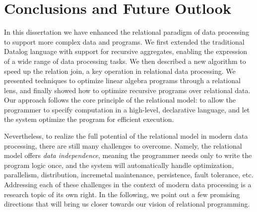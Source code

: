 \chapter{Conclusions and Future Outlook}
\label{chap:conclusions}

In this dissertation we have enhanced the relational paradigm 
 of data processing to support more complex data and programs.
We first extended the traditional Datalog 
 language with support for recursive aggregates,
 enabling the expression of a wide range of data processing tasks.
We then described a new algorithm to speed up the relation join, 
 a key operation in relational data processing.
We presented techniques to optimize linear algebra programs 
 through a relational lens,
 and finally showed how to optimize recursive programs over relational data.
Our approach follows the core principle of the relational model:
 to allow the programmer to specify computation in a high-level, declarative language,
 and let the system optimize the program for efficient execution.

Nevertheless, to realize the full potential of the relational model 
 in modern data processing, 
 there are still many challenges to overcome.
Namely, the relational model offers {\em data independence},
 meaning the programmer needs only to write the program logic once, 
 and the system will automatically handle
 optimization, parallelism, distribution, incremetal maintenance, 
 persistence, fault tolerance, etc.
Addressing each of these challenges in the context of modern data processing
 is a research topic of its own right.
In the following, we point out a few promising directions 
 that will bring us closer towards our vision of relational programming.

